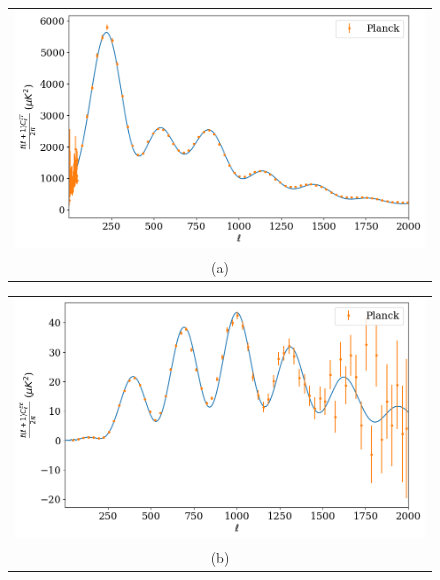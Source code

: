 \documentclass{aa}
\begin{document}
\begin{figure}
  \centering
  \begin{tabular}{@{}c@{}}
    \includegraphics[width=\linewidth]{report/figures/power_spectrum_TT_linear.png} \\[\abovecaptionskip]
    \small (a)
  \end{tabular}

  \vspace{\floatsep}
  \begin{tabular}{@{}c@{}}
       \includegraphics[width=\linewidth]{report/figures/power_spectrum_EE.png} \\[\abovecaptionskip]
    \small (b)
  \end{tabular}


  \vspace{\floatsep}


\end{figure}
\end{document}
